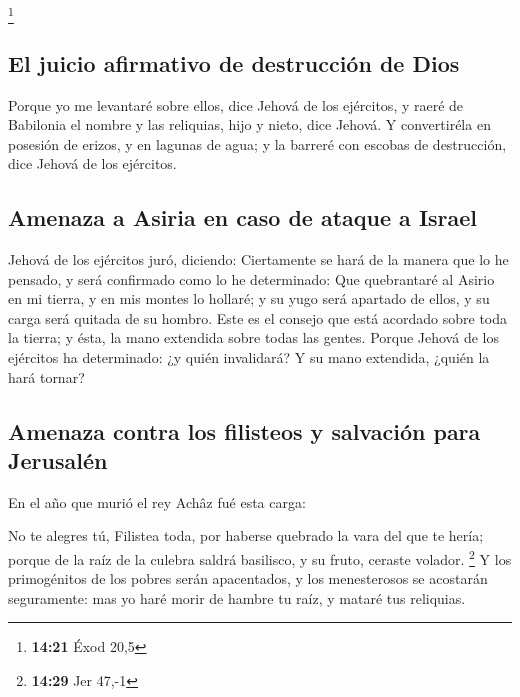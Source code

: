 \footnote{\textbf{14:21} Éxod 20,5}

\hypertarget{el-juicio-afirmativo-de-destrucciuxf3n-de-dios}{%
\subsection{El juicio afirmativo de destrucción de
Dios}\label{el-juicio-afirmativo-de-destrucciuxf3n-de-dios}}

 Porque yo me levantaré sobre ellos, dice Jehová de los
ejércitos, y raeré de Babilonia el nombre y las reliquias, hijo y nieto,
dice Jehová.  Y convertiréla en posesión de erizos, y en
lagunas de agua; y la barreré con escobas de destrucción, dice Jehová de
los ejércitos.

\hypertarget{amenaza-a-asiria-en-caso-de-ataque-a-israel}{%
\subsection{Amenaza a Asiria en caso de ataque a
Israel}\label{amenaza-a-asiria-en-caso-de-ataque-a-israel}}

 Jehová de los ejércitos juró, diciendo: Ciertamente se
hará de la manera que lo he pensado, y será confirmado como lo he
determinado:  Que quebrantaré al Asirio en mi tierra, y
en mis montes lo hollaré; y su yugo será apartado de ellos, y su carga
será quitada de su hombro.  Este es el consejo que está
acordado sobre toda la tierra; y ésta, la mano extendida sobre todas las
gentes.  Porque Jehová de los ejércitos ha determinado:
¿y quién invalidará? Y su mano extendida, ¿quién la hará tornar?

\hypertarget{amenaza-contra-los-filisteos-y-salvaciuxf3n-para-jerusaluxe9n}{%
\subsection{Amenaza contra los filisteos y salvación para
Jerusalén}\label{amenaza-contra-los-filisteos-y-salvaciuxf3n-para-jerusaluxe9n}}

 En el año que murió el rey Achâz fué esta carga:

 No te alegres tú, Filistea toda, por haberse quebrado la
vara del que te hería; porque de la raíz de la culebra saldrá basilisco,
y su fruto, ceraste volador. \footnote{\textbf{14:29} Jer 47,-1}
 Y los primogénitos de los pobres serán apacentados, y
los menesterosos se acostarán seguramente: mas yo haré morir de hambre
tu raíz, y mataré tus reliquias.

